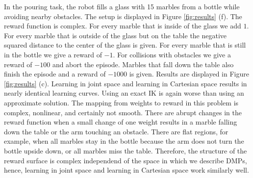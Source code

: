 \documentclass{svproc}
\begin{document}
In the pouring task, the robot fills a glass with 15 marbles from a bottle
while avoiding nearby obstacles. The setup is displayed in Figure
\ref{fig:results} (f).
The reward function is complex.
For every marble that is inside of the glass we add $1$. For
every marble that is outside of the glass but on the table the negative
squared distance to the center of the glass is given. For every marble that
is still in the bottle we give a reward of $-1$. For collisions with
obstacles we give a reward of $-100$ and abort the episode. Marbles that
fall down the table also finish the episode and a reward of $-1000$ is
given.
Results are displayed in Figure \ref{fig:results} (c).
Learning in joint space and learning in Cartesian space results in
nearly identical learning curves. Using an exact IK
is again worse than using an approximate solution.
The mapping from weights to reward in this problem is complex,
nonlinear, and certainly not smooth. There are abrupt changes in
the reward function when a small change of one weight results in
a marble falling down the table or the arm touching an obstacle.
There are flat regions, for example, when all marbles stay
in the bottle because the arm does not turn the bottle upside down,
or all marbles miss the table. Therefore, the structure of the
reward surface is complex independend of the space in which
we describe DMPs, hence, learning in joint space and learning
in Cartesian space work similarly well.
\end{document}
